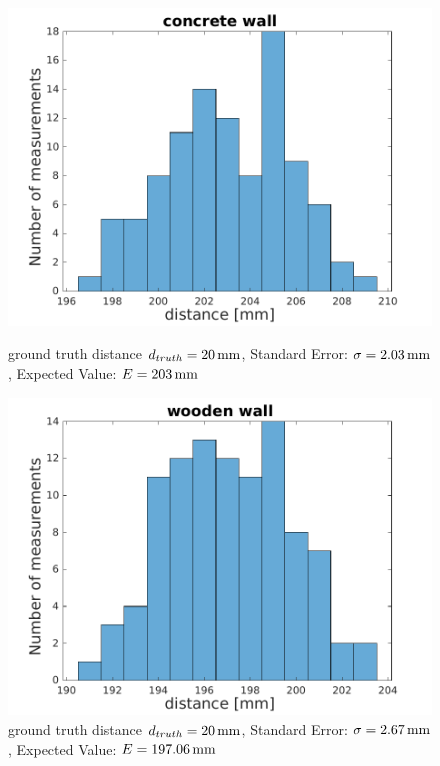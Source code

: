 \begin{figure}
	\centering
	\begin{minipage}{0.3\textwidth}
		\includegraphics[width=0.9\linewidth]{pictures/concrete_hist.pdf}
		\caption{ground truth distance $d_{truth}= \unit[20]{mm}$, Standard Error: $\sigma=\unit[2.03]{mm}$, Expected Value: $E=\unit[203]{mm}$}
		\label{fig:surface_hist_con}
	\end{minipage}
	\quad
	\begin{minipage}{0.3\textwidth}
		\includegraphics[width=0.9\linewidth]{pictures/wooden_wall.pdf}
		\caption{ground truth distance $d_{truth}= \unit[20]{mm}$, Standard Error: $\sigma=\unit[2.67]{mm}$, Expected Value: $E=\unit[197.06]{mm}$}
		\label{fig:surface_hist_wood}
	\end{minipage}
	\quad
	\begin{minipage}{0.3\textwidth}

\end{minipage}
\end{figure}
